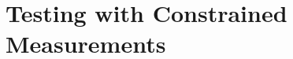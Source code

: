\documentclass[biber,plain]{nowfnt} %
\begin{document}
\chapter{Testing with Constrained Measurements}
  \label{chap:constrained}


%
%
%
%
\end{document}
